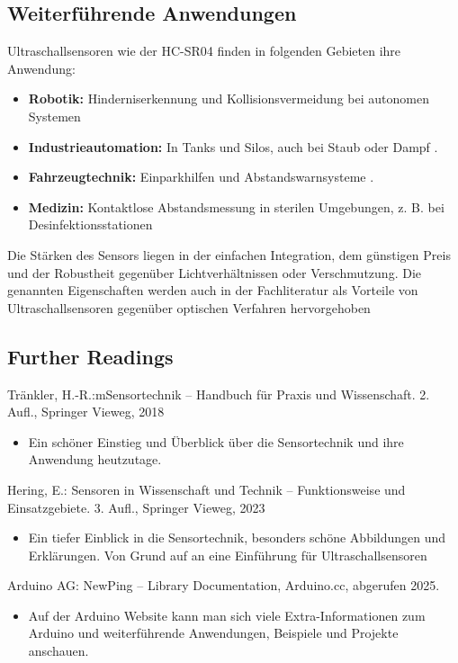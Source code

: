 \subsection{Weiterführende Anwendungen}
Ultraschallsensoren wie der HC-SR04 finden in folgenden Gebieten ihre Anwendung:
\begin{itemize}
	\item \textbf{Robotik:} Hinderniserkennung und Kollisionsvermeidung bei autonomen Systemen
	\cite{Traenkler:2014}
	\item \textbf{Industrieautomation:} In Tanks und Silos, auch bei Staub oder Dampf \cite{Hering:2023}.
	\item \textbf{Fahrzeugtechnik:} Einparkhilfen und Abstandswarnsysteme \cite{Hering:2023}.
	\item \textbf{Medizin:} Kontaktlose Abstandsmessung in sterilen Umgebungen, z. B. bei
	Desinfektionsstationen \cite{Hering:2023}
\end{itemize}
Die Stärken des Sensors liegen in der einfachen Integration, dem günstigen Preis und der
Robustheit gegenüber Lichtverhältnissen oder Verschmutzung.
Die genannten Eigenschaften werden auch in der Fachliteratur als Vorteile von
Ultraschallsensoren gegenüber optischen Verfahren hervorgehoben \cite{Hering:2023}

\subsection{Further Readings}
Tränkler, H.-R.:mSensortechnik – Handbuch für Praxis und Wissenschaft. 2. Aufl., Springer Vieweg, 2018 \cite{Traenkler:2018}
\begin{itemize}
	\item Ein schöner Einstieg und Überblick über die Sensortechnik und ihre Anwendung heutzutage.
\end{itemize} 

Hering, E.: Sensoren in Wissenschaft und Technik – Funktionsweise und Einsatzgebiete. 3. Aufl., Springer Vieweg, 2023 \cite{Hering:2023}
\begin{itemize}
	\item Ein tiefer Einblick in die Sensortechnik, besonders schöne Abbildungen und Erklärungen. Von Grund auf an eine Einführung für Ultraschallsensoren
\end{itemize} 

Arduino AG: NewPing – Library Documentation, Arduino.cc, abgerufen 2025. \cite{Arduino:2024}
\begin{itemize}
	\item 	Auf der Arduino Website kann man sich viele Extra-Informationen zum Arduino und weiterführende Anwendungen, Beispiele und Projekte anschauen.
\end{itemize}


